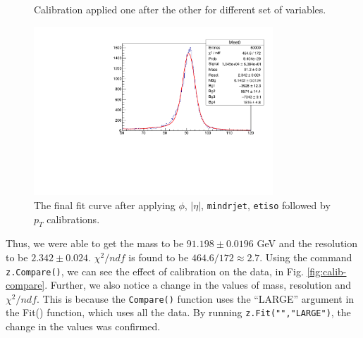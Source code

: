 \documentclass[a4paper]{report}
\numberwithin{equation}{section}
\begin{document}
\begin{figure}[htb!]
	\quad
	\centering
	\caption{Calibration applied one after the other for different set of variables.}
	\label{fig:calib-process}
\end{figure}

\begin{figure}[htpb]
    \centering
    \includegraphics[width=0.8\textwidth]{final_calib_fit}
    \caption{The final fit curve after applying $\phi$, $|\eta|$, \texttt{mindrjet}, \texttt{etiso} followed by $p_T$ calibrations.}
    \label{fig:final-calib}
\end{figure}

Thus, we were able to get the mass to be $91.198 \pm 0.0196$ GeV and the resolution to be $2.342 \pm 0.024$. $\chi^2/ndf$ is found to be $464.6 / 172 \approx 2.7$. Using the command \texttt{z.Compare()}, we can see the effect of calibration on the data, in Fig. \ref{fig:calib-compare}. Further, we also notice a change in the values of mass, resolution and $\chi^2/ndf$. This is because the \texttt{Compare()} function uses the ``LARGE'' argument in the Fit() function, which uses all the data. By running \texttt{z.Fit("","LARGE")}, the change in the values was confirmed. 
\end{document}
